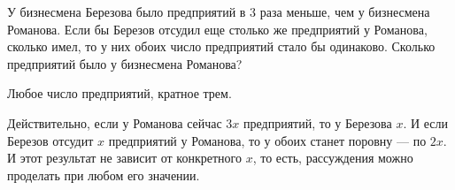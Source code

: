 
\begin{itemize}
\itA У бизнесмена Березова было предприятий в 3 раза меньше, чем у бизнесмена Романова. Если бы Березов отсудил еще столько же предприятий у Романова, сколько имел, то у них обоих число предприятий стало бы одинаково. Сколько предприятий было у бизнесмена Романова?

\itr Любое число предприятий, кратное трем.

Действительно, если у Романова сейчас $3x$ предприятий, то у Березова $x$. И если Березов отсудит $x$ предприятий у Романова, то у обоих станет поровну — по $2x$. И этот результат не зависит от конкретного $x$, то есть, рассуждения можно проделать при любом его значении.
\end{itemize}